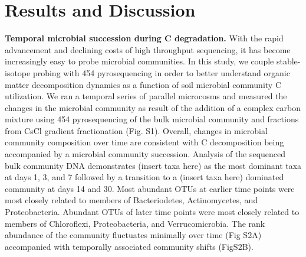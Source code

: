 \section{Results and Discussion}


\textbf{Temporal microbial succession during C degradation.} With the rapid advancement and declining costs of high throughput sequencing, it has become increasingly easy to probe microbial communities.  In this study, we couple stable-isotope probing with 454 pyrosequencing in order to better understand organic matter decomposition dynamics as a function of soil microbial community C utilization. We ran a temporal series of parallel microcosms and measured the changes in the microbial community as result of the addition of a complex carbon mixture using 454 pyrosequencing of the bulk microbial community and fractions from CsCl gradient fractionation (Fig. S1). Overall, changes in microbial community composition over time are consistent with C decomposition being accompanied by a microbial community succession. Analysis of the sequenced bulk community DNA demonstrates (insert taxa here) as the most dominant taxa at days 1, 3, and 7 followed by a transition to a (insert taxa here) dominated community at days 14 and 30. Most abundant OTUs at earlier time points were most closely related to members of Bacteriodetes, Actinomycetes, and Proteobacteria. Abundant OTUs of later time points were most closely related to members of Chloroflexi, Proteobacteria, and Verrucomicrobia.  The rank abundance of the community fluctuates minimally over time (Fig S2A) accompanied with temporally associated community shifts (FigS2B).   

